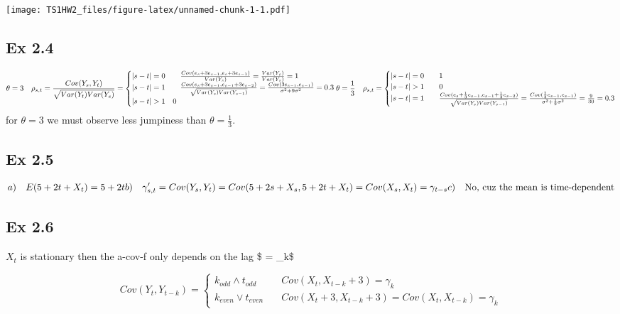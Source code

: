 \documentclass[
]{article}
\begin{document}
\texttt{[image: TS1HW2\_files/figure-latex/unnamed-chunk-1-1.pdf]}

\subsection{Ex 2.4}\label{ex-2.4}

\[
\theta = 3 \quad \rho_{s,t} = \frac{Cov(Y_s,Y_t)}{\sqrt{Var(Y_t)Var(Y_s)}} = \begin{cases}
|s-t| = 0 & \quad \frac{Cov(e_s + 3e_{s-1} , e_s + 3e_{s-1} )}{Var(Y_s)} = \frac{Var(Y_s)}{Var(Y_s)} = 1 \\
|s-t| = 1 & \quad \frac{Cov(e_s + 3e_{s-1}, e_{s-1} + 3e_{s-2} )}{\sqrt{Var(Y_s)Var(Y_{s-1})}}  = \frac{Cov(3e_{s-1}, e_{s-1})}{\sigma^2 + 9\sigma^2} = 0.3 \\
|s-t| > 1 & 0
\end{cases} \\
\theta = \frac{1}{3} \quad  \rho_{s,t} =\begin{cases}
|s-t| = 0 & \quad 1  \\
|s-t| > 1 & \quad 0 \\
|s-t| = 1 & \quad \frac{Cov(e_s + \frac{1}{3}e_{s-1}, e_{s-1} + \frac{1}{3}e_{s-2} )}{\sqrt{Var(Y_s)Var(Y_{s-1})}}  = \frac{Cov(\frac{1}{3}e_{s-1}, e_{s-1})}{\sigma^2 + \frac{1}{9}\sigma^2} = \frac{9}{30} = 0.3 \\
\end{cases}
\] for \(\theta = 3\) we must observe less jumpiness than
\(\theta = \frac{1}{3}\).

\subsection{Ex 2.5}\label{ex-2.5}

\[
a) \quad  E(5+2t + X_t) = 5 + 2t \\
b) \quad  \gamma'_{s,t} = Cov(Y_s,Y_t) = Cov(5+2s+X_s, 5+2t+X_t) = Cov(X_s,X_t) = \gamma_{t-s} \\
c) \quad \text{No, cuz the mean is time-dependent}
\]

\subsection{Ex 2.6}\label{ex-2.6}

\(X_t\) is stationary then the a-cov-f only depends on the lag \$ =
\gamma\_k\$

\[
Cov(Y_t, Y_{t-k}) = 
\begin{cases} 
k_{odd} \land t_{odd} \ \quad & Cov(X_t, X_{t-k} + 3) = \gamma_k \\
k_{even} \lor t_{even} \quad &  Cov(X_t + 3, X_{t-k} + 3)= Cov(X_t, X_{t-k}) = \gamma_k
\end{cases}
\]
\end{document}
